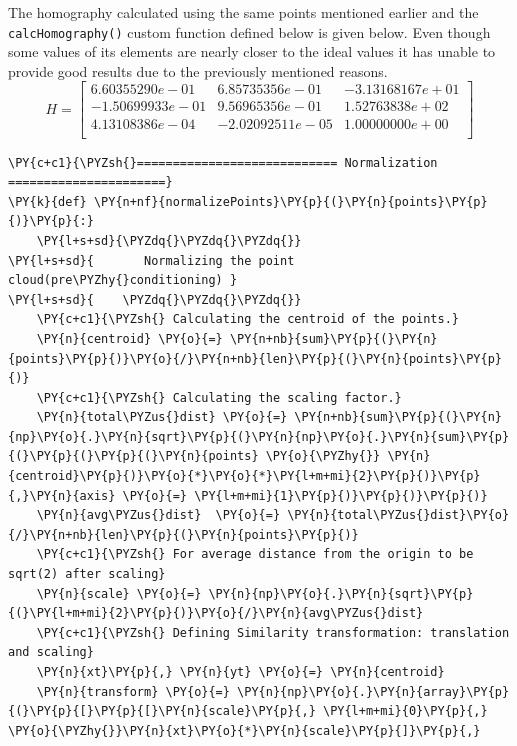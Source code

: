 \documentclass[a4paper,11pt]{article}%
\begin{document}
The homography calculated using the same points mentioned earlier and the {\tt calcHomography()} custom function defined below is given below. Even though some values of its elements are nearly closer to the ideal values it has unable to provide good results due to the previously mentioned reasons.  
{ \scriptsize
\[
H = 
\begin{bmatrix}
 6.60355290e-01&  6.85735356e-01 &-3.13168167e+01\\
-1.50699933e-01 & 9.56965356e-01 & 1.52763838e+02\\
 4.13108386e-04 &-2.02092511e-05 & 1.00000000e+00\\
\end{bmatrix}
\]
}

    \begin{tcolorbox}[breakable, size=fbox, boxrule=1pt, pad at break*=1mm,colback=cellbackground, colframe=cellborder]
\begin{Verbatim}[commandchars=\\\{\}]
\PY{c+c1}{\PYZsh{}============================ Normalization ======================}
\PY{k}{def} \PY{n+nf}{normalizePoints}\PY{p}{(}\PY{n}{points}\PY{p}{)}\PY{p}{:}
    \PY{l+s+sd}{\PYZdq{}\PYZdq{}\PYZdq{}}
\PY{l+s+sd}{       Normalizing the point cloud(pre\PYZhy{}conditioning) }
\PY{l+s+sd}{    \PYZdq{}\PYZdq{}\PYZdq{}}
    \PY{c+c1}{\PYZsh{} Calculating the centroid of the points.}
    \PY{n}{centroid} \PY{o}{=} \PY{n+nb}{sum}\PY{p}{(}\PY{n}{points}\PY{p}{)}\PY{o}{/}\PY{n+nb}{len}\PY{p}{(}\PY{n}{points}\PY{p}{)}
    \PY{c+c1}{\PYZsh{} Calculating the scaling factor.}
    \PY{n}{total\PYZus{}dist} \PY{o}{=} \PY{n+nb}{sum}\PY{p}{(}\PY{n}{np}\PY{o}{.}\PY{n}{sqrt}\PY{p}{(}\PY{n}{np}\PY{o}{.}\PY{n}{sum}\PY{p}{(}\PY{p}{(}\PY{p}{(}\PY{n}{points} \PY{o}{\PYZhy{}} \PY{n}{centroid}\PY{p}{)}\PY{o}{*}\PY{o}{*}\PY{l+m+mi}{2}\PY{p}{)}\PY{p}{,}\PY{n}{axis} \PY{o}{=} \PY{l+m+mi}{1}\PY{p}{)}\PY{p}{)}\PY{p}{)}
    \PY{n}{avg\PYZus{}dist}  \PY{o}{=} \PY{n}{total\PYZus{}dist}\PY{o}{/}\PY{n+nb}{len}\PY{p}{(}\PY{n}{points}\PY{p}{)}
    \PY{c+c1}{\PYZsh{} For average distance from the origin to be sqrt(2) after scaling}
    \PY{n}{scale} \PY{o}{=} \PY{n}{np}\PY{o}{.}\PY{n}{sqrt}\PY{p}{(}\PY{l+m+mi}{2}\PY{p}{)}\PY{o}{/}\PY{n}{avg\PYZus{}dist}    
    \PY{c+c1}{\PYZsh{} Defining Similarity transformation: translation and scaling}
    \PY{n}{xt}\PY{p}{,} \PY{n}{yt} \PY{o}{=} \PY{n}{centroid}
    \PY{n}{transform} \PY{o}{=} \PY{n}{np}\PY{o}{.}\PY{n}{array}\PY{p}{(}\PY{p}{[}\PY{p}{[}\PY{n}{scale}\PY{p}{,} \PY{l+m+mi}{0}\PY{p}{,} \PY{o}{\PYZhy{}}\PY{n}{xt}\PY{o}{*}\PY{n}{scale}\PY{p}{]}\PY{p}{,}

\end{Verbatim}
\end{tcolorbox}
\end{document}
